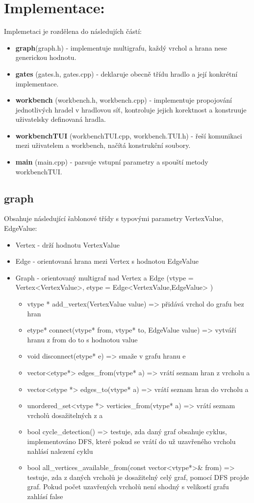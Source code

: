 \documentclass[12pt, oneside]{article}
\begin{document}
\section*{Implementace:}
Implemetaci je rozdělena do následujích částí: 
\begin{itemize}
\item \textbf{graph}(graph.h) - implementuje multigrafu, každý vrchol a hrana nese generickou hodnotu. 
\item \textbf{gates} (gates.h, gates.cpp) - deklaruje obecně třídu hradlo a její konkrétní implementace.
\item \textbf{workbench} (workbench.h, workbench.cpp) -  implementuje propojování jednotlivých hradel v hradlovou síť, kontroluje jejich korektnost a konstruuje uživatelsky definovaná hradla.
\item \textbf{workbenchTUI} (workbenchTUI.cpp, workbench.TUI.h) - řeší komunikaci mezi uživatelem a workbench, načítá konstrukční soubory.
\item \textbf{main} (main.cpp) - parsuje vstupní parametry a spouští metody workbenchTUI.
\end{itemize}
\subsection*{graph} 
Obsahuje následující šablonové třídy s typovými parametry VertexValue, EdgeValue: 
\begin{itemize}
\item Vertex - drží hodnotu VertexValue
\item Edge - orientovaná hrana mezi Vertex s hodnotou EdgeValue
\item Graph - orientovaný multigraf nad Vertex a Edge (vtype = Vertex<VertexValue>, etype = Edge<VertexValue,EdgeValue> )
\begin{itemize}
\item vtype * add\_vertex(VertexValue value) => přidává vrchol  do grafu bez hran
\item etype* connect(vtype* from, vtype* to, EdgeValue value) => vytváří hranu z from do to s hodnotou value
\item void disconnect(etype* e) => smaže v grafu hranu e
\item vector<etype*> edges\_from(vtype* a) => vrátí seznam hran z vrcholu a
\item vector<etype *> edges\_to(vtype* a) => vrátí seznam hran do vrcholu a 
\item unordered\_set<vtype *> verticies\_from(vtype* a) => vrátí seznam vrcholů dosažitelných z a 
\item bool cycle\_detection() => testuje, zda daný graf obsahuje cyklus,  implementováno DFS, které pokud se vrátí do už uzavřeného vrcholu nahlásí nalezení cyklu
\item bool all\_vertices\_available\_from(const vector<vtype*>\& from) => testuje, zda z daných vrcholů je dosažitelný celý graf, pomocí DFS projde graf. Pokud počet uzavřených vrcholů není shodný s velikostí grafu zahlásí false
\end{itemize} 
\end{itemize} 
\end{document}
